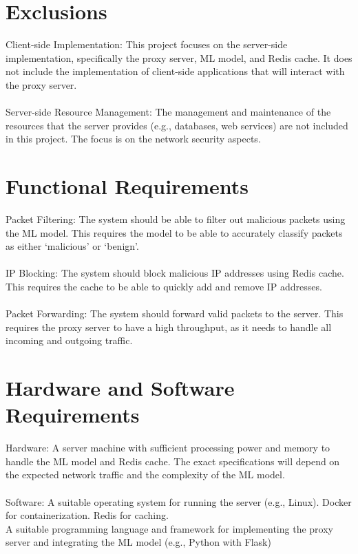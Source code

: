\section{Exclusions}
Client-side Implementation: This project focuses on the server-side implementation, specifically the proxy server, ML model, and Redis cache. It does not include the implementation of client-side applications that will interact with the proxy server.
\\\\
\indent Server-side Resource Management: The management and maintenance of the resources that the server provides (e.g., databases, web services) are not included in this project. The focus is on the network security aspects.

\section{Functional Requirements}

Packet Filtering: The system should be able to filter out malicious packets using the ML model. This requires the model to be able to accurately classify packets as either ‘malicious’ or ‘benign’.
\\\\
\indent IP Blocking: The system should block malicious IP addresses using Redis cache. This requires the cache to be able to quickly add and remove IP addresses.
\\\\
\indent Packet Forwarding: The system should forward valid packets to the server. This requires the proxy server to have a high throughput, as it needs to handle all incoming and outgoing traffic.


\section{Hardware and Software Requirements
}

Hardware: A server machine with sufficient processing power and memory to handle the ML model and Redis cache. The exact specifications will depend on the expected network traffic and the complexity of the ML model.\\\\
\indent Software: A suitable operating system for running the server (e.g., Linux). Docker for containerization. Redis for caching.
\\
A suitable programming language and framework for implementing the proxy server and integrating the ML model (e.g., Python with Flask)

